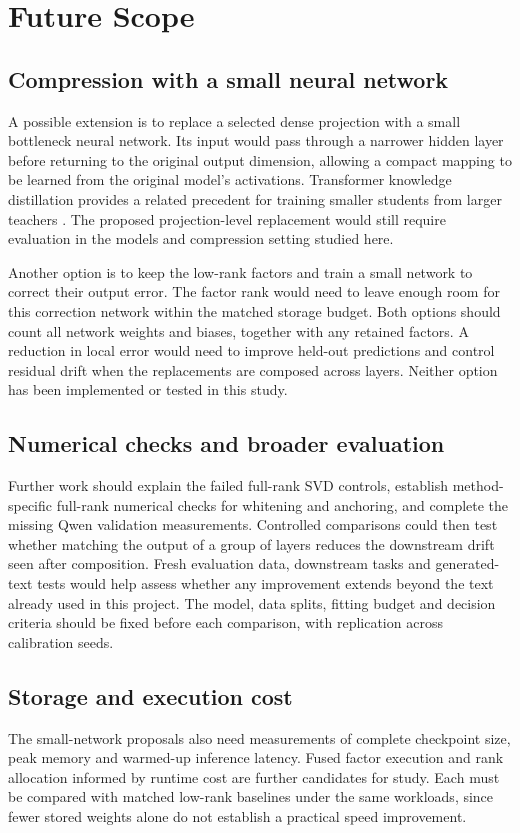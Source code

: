 \documentclass[conference]{IEEEtran}
\begin{document}
\section{Future Scope}
\subsection{Compression with a small neural network}
A possible extension is to replace a selected dense projection with a small bottleneck neural network. Its input would pass through a narrower hidden layer before returning to the original output dimension, allowing a compact mapping to be learned from the original model's activations. Transformer knowledge distillation provides a related precedent for training smaller students from larger teachers \cite{jiao2020tinybert}. The proposed projection-level replacement would still require evaluation in the models and compression setting studied here.\par\smallskip
Another option is to keep the low-rank factors and train a small network to correct their output error. The factor rank would need to leave enough room for this correction network within the matched storage budget. Both options should count all network weights and biases, together with any retained factors. A reduction in local error would need to improve held-out predictions and control residual drift when the replacements are composed across layers. Neither option has been implemented or tested in this study.\par\smallskip
\subsection{Numerical checks and broader evaluation}
Further work should explain the failed full-rank SVD controls, establish method-specific full-rank numerical checks for whitening and anchoring, and complete the missing Qwen validation measurements. Controlled comparisons could then test whether matching the output of a group of layers reduces the downstream drift seen after composition. Fresh evaluation data, downstream tasks and generated-text tests would help assess whether any improvement extends beyond the text already used in this project. The model, data splits, fitting budget and decision criteria should be fixed before each comparison, with replication across calibration seeds.\par\smallskip
\subsection{Storage and execution cost}
The small-network proposals also need measurements of complete checkpoint size, peak memory and warmed-up inference latency. Fused factor execution and rank allocation informed by runtime cost are further candidates for study. Each must be compared with matched low-rank baselines under the same workloads, since fewer stored weights alone do not establish a practical speed improvement.\par\smallskip
\end{document}
